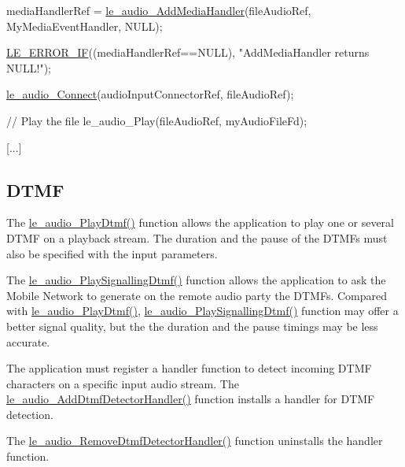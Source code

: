 \begin{DoxyCode}
mediaHandlerRef = \hyperlink{le__audio__interface_8h_a9996ac9d23333cf8219f28b69cac4f81}{le\_audio\_AddMediaHandler}(fileAudioRef,
                                           MyMediaEventHandler,
                                           NULL);

\hyperlink{le__log_8h_aceaf11a11691d6c676e36dd317b38dbd}{LE\_ERROR\_IF}((mediaHandlerRef==NULL), \textcolor{stringliteral}{"AddMediaHandler returns NULL!"});


\hyperlink{le__audio__interface_8h_a338df65b2fb1ae0140d86880adbcf0de}{le\_audio\_Connect}(audioInputConnectorRef, fileAudioRef);

\textcolor{comment}{// Play the file}
le\_audio\_Play(fileAudioRef, myAudioFileFd);

[...]
\end{DoxyCode}
\hypertarget{c_audio_le_audio_dtmf}{}\subsection{D\+T\+M\+F}\label{c_audio_le_audio_dtmf}
The \hyperlink{le__audio__interface_8h_a8b1546842a6e917db9a9458aceb77c82}{le\+\_\+audio\+\_\+\+Play\+Dtmf()} function allows the application to play one or several D\+T\+M\+F on a playback stream. The duration and the pause of the D\+T\+M\+Fs must also be specified with the input parameters.

The \hyperlink{le__audio__interface_8h_a852728586cacfcbf63ae59b6f80847eb}{le\+\_\+audio\+\_\+\+Play\+Signalling\+Dtmf()} function allows the application to ask the Mobile Network to generate on the remote audio party the D\+T\+M\+Fs. Compared with \hyperlink{le__audio__interface_8h_a8b1546842a6e917db9a9458aceb77c82}{le\+\_\+audio\+\_\+\+Play\+Dtmf()}, \hyperlink{le__audio__interface_8h_a852728586cacfcbf63ae59b6f80847eb}{le\+\_\+audio\+\_\+\+Play\+Signalling\+Dtmf()} function may offer a better signal quality, but the the duration and the pause timings may be less accurate.

The application must register a handler function to detect incoming D\+T\+M\+F characters on a specific input audio stream. The \hyperlink{le__audio__interface_8h_a6e65275798c0db287fc1b540cdc0db8b}{le\+\_\+audio\+\_\+\+Add\+Dtmf\+Detector\+Handler()} function installs a handler for D\+T\+M\+F detection.

The \hyperlink{le__audio__interface_8h_a7fd6191ed6ff512407bfe01d20a51459}{le\+\_\+audio\+\_\+\+Remove\+Dtmf\+Detector\+Handler()} function uninstalls the handler function.

